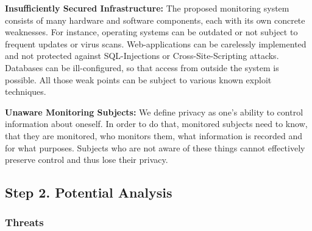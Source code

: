 \textbf{Insufficiently Secured Infrastructure:}
The proposed monitoring system consists of many hardware and software components, each with its own concrete weaknesses.
For instance, operating systems can be outdated or not subject to frequent updates or virus scans.
Web-applications can be carelessly implemented and not protected against SQL-Injections or Cross-Site-Scripting attacks.
Databases can be ill-configured, so that access from outside the system is possible.
All those weak points can be subject to various known exploit techniques.

\textbf{Unaware Monitoring Subjects:}
We define privacy as one's ability to control information about oneself. 
In order to do that, monitored subjects need to know, that they are monitored, who monitors them, what information is recorded and for what purposes.
Subjects who are not aware of these things cannot effectively preserve control and thus lose their privacy.


\subsection{Step 2. Potential Analysis}

\subsubsection{Threats}



%
%
%

